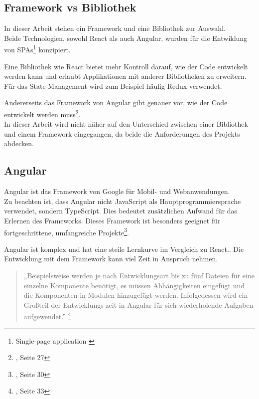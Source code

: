 \subsection{Framework vs Bibliothek}
\begin{flushleft}
In dieser Arbeit stehen ein Framework und eine Bibliothek zur Auswahl.
\\
Beide Technologien, sowohl React als auch Angular, wurden für die Entwiklung von SPAs\footnote{Single-page application {\cite{MO1}}} konzipiert.

Eine Bibliothek wie React bietet mehr Kontroll darauf, wie der Code entwickelt werden kann und erlaubt Applikationen mit anderer Bibliotheken zu erweitern. Für das State-Management wird zum Beispiel häufig Redux{\cite{RE1}} verwendet.

Andererseits das Framework von Angular gibt genauer vor, wie der Code entwickelt werden muss\footnote{{\cite{AN1}}, Seite 27}.
\\
In dieser Arbeit wird nicht näher auf den Unterschied zwischen einer Bibliothek und einem Framework eingegangen, da beide die Anforderungen des Projekts abdecken.
\end{flushleft}

\subsection{Angular}
Angular ist das Framework von Google für Mobil- und Webanwendungen.
\\


Zu beachten ist, dass Angular nicht JavaScript als Hauptprogrammiersprache verwendet, sondern TypeScript. Dies bedeutet zusätzlichen Aufwand für das Erlernen des Frameworks. Dieses Framework ist besonders geeignet für fortgeschrittene, umfangreiche Projekte\footnote{{\cite{AN1}}, Seite 30}.

Angular ist komplex und hat eine steile Lernkurve im Vergleich zu React.{\cite{E01}}. Die Entwicklung mit dem Framework kann viel Zeit in Anspruch nehmen.
\begin{quote}
  „Beispielsweise werden je nach Entwicklungsart bis zu fünf Dateien für eine einzelne Komponente benötigt, es müssen Abhängigkeiten eingefügt und die Komponenten in Modulen hinzugefügt werden. Infolgedessen wird ein Großteil der Entwicklungs-zeit in Angular für sich wiederholende Aufgaben aufgewendet.” 
  \footnote{{\cite{AN1}, Seite 33}}
    \end{quote}

